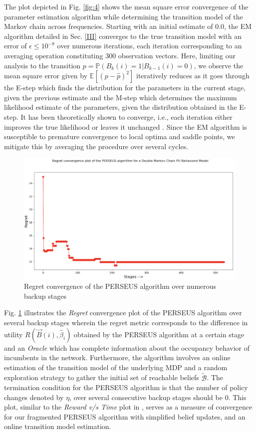 \documentclass[10pt,twocolumn]{IEEEtran}
\begin{document}
The plot depicted in Fig. \ref{fig:4} shows the mean square error convergence of the parameter estimation algorithm while determining the transition model of the Markov chain across frequencies. Starting with an initial estimate of 0.0, the EM algorithm detailed in Sec. \ref{III} converges to the true transition model with an error of $\epsilon \leq 10^{-8}$ over numerous iterations, each iteration corresponding to an averaging operation constituting 300 observation vectors. Here, limiting our analysis to the transition $p{=}\mathbb{P}(B_{k}(i){=}1|B_{k-1}(i){=}0)$, we observe the mean square error given by $\mathbb{E}[(p - \hat{p})^{2}]$ iteratively reduces as it goes through the E-step which finds the distribution for the parameters in the current stage, given the previous estimate and the M-step which determines the maximum likelihood estimate of the parameters, given the distribution obtained in the E-step. It has been theoretically shown to converge, i.e., each iteration either improves the true likelihood or leaves it unchanged \cite{Neal1998}. Since the EM algorithm is susceptible to premature convergence to local optima and saddle points, we mitigate this by averaging the procedure over several cycles.
\begin{figure}
    \centering
    \includegraphics[width=0.95\linewidth]{PerseusRegretConvergence.png}
    \caption{Regret convergence of the PERSEUS algorithm over numerous backup stages}
    \label{fig:5}
\end{figure}

Fig. \ref{fig:5} illustrates the \emph{Regret} convergence plot of the PERSEUS algorithm over several backup stages wherein the regret metric corresponds to the difference in utility $R(\vec{B}(i), \hat{\beta}_{i})$ obtained by the PERSEUS algorithm at a certain stage and an \emph{Oracle} which has complete information about the occupancy behavior of incumbents in the network. Furthermore, the algorithm involves an online estimation of the transition model of the underlying MDP and a random exploration strategy to gather the initial set of reachable beliefs $\tilde{\mathcal{B}}$. The termination condition for the PERSEUS algorithm is that the number of policy changes denoted by $\eta$, over several consecutive backup stages should be $0$. This plot, similar to the \emph{Reward v/s Time} plot in \cite{DBLP:journals/corr/abs-1109-2145}, serves as a measure of convergence for our fragmented PERSEUS algorithm with simplified belief updates, and an online transition model estimation.
\end{document}
